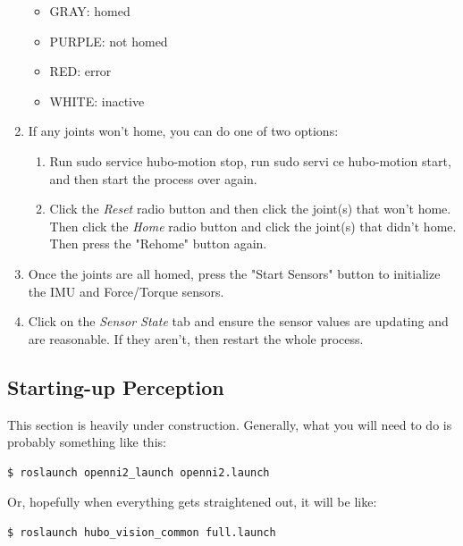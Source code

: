 \documentclass[letterpaper, 10 pt]{report}
\begin{document}
\begin{enumerate}
    \begin{itemize}
      \item GRAY: homed
      \item PURPLE: not homed
      \item RED: error
      \item WHITE: inactive
    \end{itemize}
  \item If any joints won't home, you can do one of two options:
    \begin{enumerate}
      \item Run sudo service hubo-motion stop, run sudo servi	ce hubo-motion start, and then start the process over again.
      \item Click the \textit{Reset} radio button and then click the joint(s) that won't home. Then click the \textit{Home} radio button and click the joint(s) that didn't home. Then press the "Rehome" button again.
    \end{enumerate}
  \item Once the joints are all homed, press the "Start Sensors" button to initialize the IMU and Force/Torque sensors.
  \item Click on the \textit{Sensor State} tab and ensure the sensor values are updating and are reasonable. If they aren't, then restart the whole process.
\end{enumerate}

\subsection{Starting-up Perception} \label{sec:starting-up-perception}
This section is heavily under construction. Generally, what you will need to do is probably something like this:
  \begin{lstlisting}[language=bash]
    $ roslaunch openni2_launch openni2.launch
  \end{lstlisting}
Or, hopefully when everything gets straightened out, it will be like:
  \begin{lstlisting}[language=bash]
    $ roslaunch hubo_vision_common full.launch
  \end{lstlisting}
\end{document}
